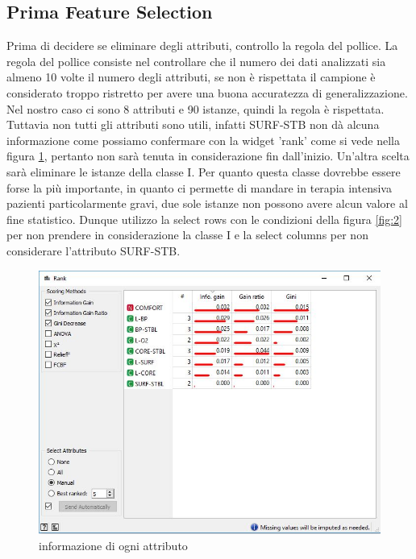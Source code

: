 \documentclass[a4paper, 12p]{report}
\begin{document}
\subsection{Prima Feature Selection}
Prima di decidere se eliminare degli attributi, controllo la regola del pollice. La regola del pollice consiste nel controllare che il numero dei dati analizzati sia almeno 10 volte il numero degli attributi, se non è rispettata il campione è considerato troppo ristretto per avere una buona accuratezza di generalizzazione. Nel nostro caso ci sono 8 attributi e 90 istanze, quindi la regola è rispettata.
Tuttavia non tutti gli attributi sono utili, infatti SURF-STB non dà alcuna informazione come possiamo confermare con la widget 'rank' come si vede nella figura \ref{fig:1}, pertanto non sarà tenuta in considerazione fin dall'inizio.
Un'altra scelta sarà eliminare le istanze della classe I. Per quanto questa classe dovrebbe essere forse la più importante, in quanto ci permette di mandare in terapia intensiva pazienti particolarmente gravi, due sole istanze non possono avere alcun valore al fine statistico. 
Dunque utilizzo la select rows con le condizioni della figura \ref{fig:2} per non prendere in considerazione la classe I e la select columns per non considerare l'attributo SURF-STB.
\begin{figure}	
	\centering
	\includegraphics[scale = 0.5]{img/rank.JPG}
	\caption{informazione di ogni attributo }\label{fig:1}
\end{figure}
\end{document}
